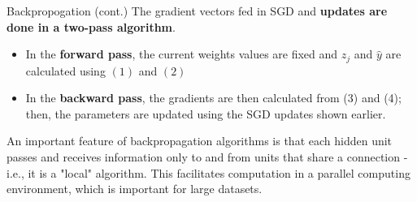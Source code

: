 \documentclass{beamer}
\begin{document}
\begin{frame}{Backpropogation (cont.)}
The gradient vectors fed in SGD and \textbf{updates are done in a two-pass algorithm}.
\begin{itemize}
\item In the \textbf{forward pass}, the current weights values are fixed and $z_{j}$ and $\hat{y}$ are calculated using $(1)$ and $(2)$
\item In the \textbf{backward pass}, the gradients are then calculated from (3) and (4); then, the parameters are updated using the SGD updates shown earlier.
\end{itemize}
An important feature of backpropagation algorithms is that each hidden unit passes and receives information only to and from units that share a connection - i.e., it is a "local" algorithm. This facilitates computation in a parallel computing environment, which is important for large datasets.
\end{frame}
\end{document}
